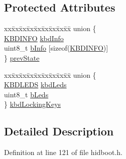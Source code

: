 \subsection*{\-Protected \-Attributes}
\begin{DoxyCompactItemize}
\item 
\begin{tabbing}
xx\=xx\=xx\=xx\=xx\=xx\=xx\=xx\=xx\=\kill
union \{\\
\>\hyperlink{struct_k_b_d_i_n_f_o}{KBDINFO} \hyperlink{class_keyboard_report_parser_ab62ffa0e72677379d1e68538625f2f28}{kbdInfo}\\
\>uint8\_t \hyperlink{class_keyboard_report_parser_a65e6da24b038be3095d06e13b4a280ba}{bInfo} \mbox{[}sizeof(\hyperlink{struct_k_b_d_i_n_f_o}{KBDINFO})\mbox{]}\\
\} \hyperlink{class_keyboard_report_parser_a60f8ec59efd65a67950cfd108742f035}{prevState}\\

\end{tabbing}\item 
\begin{tabbing}
xx\=xx\=xx\=xx\=xx\=xx\=xx\=xx\=xx\=\kill
union \{\\
\>\hyperlink{struct_k_b_d_l_e_d_s}{KBDLEDS} \hyperlink{class_keyboard_report_parser_aa867ab4b6898efa9b768bd05f275809c}{kbdLeds}\\
\>uint8\_t \hyperlink{class_keyboard_report_parser_ae910089ecc7caff18429925affc5dc7f}{bLeds}\\
\} \hyperlink{class_keyboard_report_parser_aa81cce711bcff4dc151f2b509b527700}{kbdLockingKeys}\\

\end{tabbing}\end{DoxyCompactItemize}


\subsection{\-Detailed \-Description}


\-Definition at line 121 of file hidboot.\-h.



